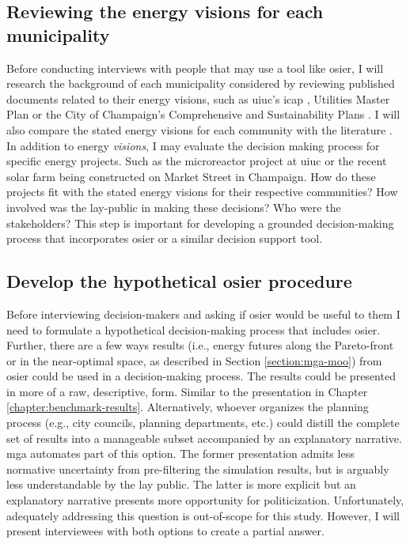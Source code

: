 \subsection{Reviewing the energy visions for each municipality}

Before conducting interviews with people that may use a tool like \ac{osier}, I
will research the background of each municipality considered by reviewing
published documents related to their energy visions, such as \ac{uiuc}'s
\ac{icap}
\cite{institute_for_sustainability_energy_and_environment_illinois_2020},
Utilities Master Plan \cite{affiliated_engineers_inc_utilities_2015} or the City
of Champaign's Comprehensive and Sustainability Plans
\cite{knight_champaign_2013,knight_champaign_2021}. I will also compare the
stated energy visions for each community with the literature
\cite{elmallah_frontlining_2022}. In addition to energy \textit{visions}, I may
evaluate the decision making process for specific energy projects. Such as the
microreactor project at \ac{uiuc} or the recent solar farm being constructed on
Market Street in Champaign. How do these projects fit with the stated energy
visions for their respective communities? How involved was the lay-public in
making these decisions? Who were the stakeholders? This step is important for
developing a grounded decision-making process that incorporates \ac{osier} or a
similar decision support tool. 

\subsection{Develop the hypothetical \ac{osier} procedure}

Before interviewing decision-makers and asking if \ac{osier} would be useful to
them I need to formulate a hypothetical decision-making process that includes
\ac{osier}. Further, there are a few ways results (i.e., energy futures along
the Pareto-front or in the near-optimal space, as described in Section
\ref{section:mga-moo}) from \ac{osier} could be used in a decision-making
process. The results could be presented in more of a raw, descriptive, form.
Similar to the presentation in Chapter \ref{chapter:benchmark-results}.
Alternatively, whoever organizes the planning process (e.g., city councils,
planning departments, etc.) could distill the complete set of results into a
manageable subset accompanied by an explanatory narrative. \ac{mga} automates
part of this option. The former presentation admits less normative uncertainty
from pre-filtering the simulation results, but is arguably less understandable
by the lay public. The latter is more explicit but an explanatory narrative
presents more opportunity for politicization. Unfortunately, adequately
addressing this question is out-of-scope for this study. However, I will present
interviewees with both options to create a partial answer.

